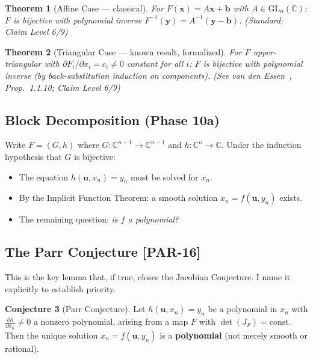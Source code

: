 \documentclass[12pt, letterpaper]{article}
\theoremstyle{plain}
\newtheorem{theorem}{Theorem}[section]
\theoremstyle{definition}
\newtheorem{conjecture}[theorem]{Conjecture}
\theoremstyle{remark}
\newcommand{\prior}[1]{\textcolor{SovGold}{\textbf{[PAR-#1]}}}
\begin{document}
\begin{theorem}[Affine Case --- classical]
For $F(\mathbf{x}) = A\mathbf{x} + \mathbf{b}$ with $A \in \mathrm{GL}_n(\mathbb{C})$:
$F$ is bijective with polynomial inverse $F^{-1}(\mathbf{y}) = A^{-1}(\mathbf{y} - \mathbf{b})$.
\hfill\textit{(Standard; Claim Level 6/9)}
\end{theorem}

\begin{theorem}[Triangular Case --- known result, formalized]
For $F$ upper-triangular with $\partial F_i/\partial x_i = c_i \neq 0$ constant for all $i$:
$F$ is bijective with polynomial inverse (by back-substitution induction on components).
\hfill\textit{(See van den Essen~\cite{vandenessen2000}, Prop.~1.1.10; Claim Level 6/9)}
\end{theorem}

\subsection{Block Decomposition (Phase 10a)}

Write $F = (G, h)$ where $G: \mathbb{C}^{n-1} \to \mathbb{C}^{n-1}$ and
$h: \mathbb{C}^n \to \mathbb{C}$. Under the induction hypothesis that $G$ is
bijective:
\begin{itemize}[nosep]
  \item The equation $h(\mathbf{u}, x_n) = y_n$ must be solved for $x_n$.
  \item By the Implicit Function Theorem: a smooth solution $x_n = f(\mathbf{u}, y_n)$ exists.
  \item The remaining question: \textit{is $f$ a polynomial?}
\end{itemize}

\subsection{The Parr Conjecture \prior{16}}

This is the key lemma that, if true, closes the Jacobian Conjecture. I name it
explicitly to establish priority.

\begin{conjecture}[Parr Conjecture]
\label{conj:parr}
Let $h(\mathbf{u}, x_n) = y_n$ be a polynomial in $x_n$ with
$\frac{\partial h}{\partial x_n} \neq 0$ a nonzero polynomial,
arising from a map $F$ with $\det(J_F) = \text{const}$.
Then the unique solution $x_n = f(\mathbf{u}, y_n)$ is a \textbf{polynomial}
(not merely smooth or rational).
\end{conjecture}
\end{document}
